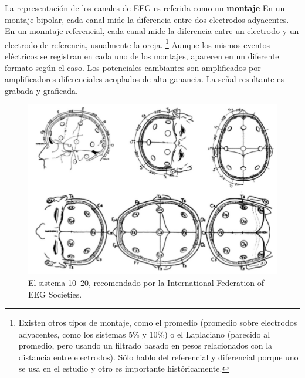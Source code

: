 La representaci\'on de los canales de EEG es referida como un \textbf{montaje}
En un montaje bipolar, cada canal mide la diferencia entre dos electrodos adyacentes.
En un monntaje referencial, cada canal mide la diferencia entre un electrodo y un electrodo
de referencia, usualmente la oreja.
\footnote{Existen otros tipos de montaje, como el promedio (promedio sobre electrodos adyacentes,
como los sistemas 5\% y 10\%) o el Laplaciano (parecido al promedio, pero usando un filtrado
basado en pesos relacionados con la distancia entre electrodos). S\'olo hablo del referencial
y diferencial porque uno se usa en el estudio y otro es importante hist\'oricamente.}
Aunque los mismos eventos el\'ectricos se registran en cada uno de los montajes,
aparecen en un diferente formato seg\'un el caso. Los potenciales cambiantes
son amplificados por amplificadores diferenciales acoplados de alta ganancia.
La se\~nal resultante es grabada y graficada.

\begin{figure}
\centering
\includegraphics[width=0.8\linewidth]{figura_6.png} 
\caption{El sistema 10--20, recomendado por la
International Federation of EEG Societies. 
}
\label{img1020}
\end{figure}

